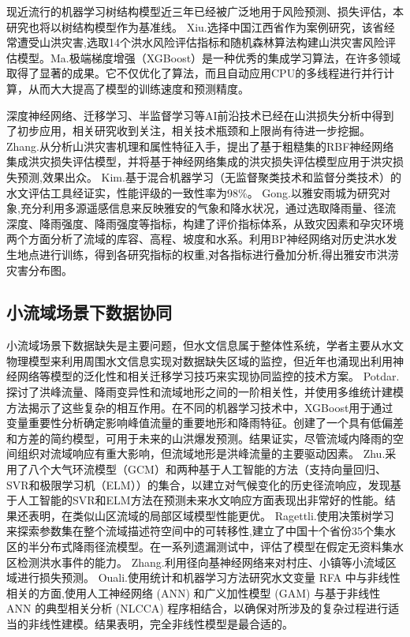 \documentclass{ctexart}
\begin{document}
现近流行的机器学习树结构模型近三年已经被广泛地用于风险预测、损失评估，本研究也将以树结构模型作为基准线。
Xiu.\cite{xiuqin2019risk}选择中国江西省作为案例研究，该省经常遭受山洪灾害,选取14个洪水风险评估指标和随机森林算法构建山洪灾害风险评估模型。Ma.\cite{ma2021xgboost}极端梯度增强（XGBoost）是一种优秀的集成学习算法，在许多领域取得了显著的成果。它不仅优化了算法，而且自动应用CPU的多线程进行并行计算，从而大大提高了模型的训练速度和预测精度。

深度神经网络、迁移学习、半监督学习等AI前沿技术已经在山洪损失分析中得到了初步应用，相关研究收到关注，相关技术瓶颈和上限尚有待进一步挖掘。
Zhang.\cite{zhang2021loss}从分析山洪灾害机理和属性特征入手，提出了基于粗糙集的RBF神经网络集成洪灾损失评估模型，并将基于神经网络集成的洪灾损失评估模型应用于洪灾损失预测,效果出众。
Kim.\cite{kim2019hybrid}基于混合机器学习（无监督聚类技术和监督分类技术）的水文评估工具经证实，性能评级的一致性率为98\%。
Gong.\cite{gong2020hazard}以雅安雨城为研究对象,充分利用多源遥感信息来反映雅安的气象和降水状况，通过选取降雨量、径流深度、降雨强度、降雨强度等指标，构建了评价指标体系，从致灾因素和孕灾环境两个方面分析了流域的库容、高程、坡度和水系。利用BP神经网络对历史洪水发生地点进行训练，得到各研究指标的权重,对各指标进行叠加分析,得出雅安市洪涝灾害分布图。




\subsection{小流域场景下数据协同}


小流域场景下数据缺失是主要问题，但水文信息属于整体性系统，学者主要从水文物理模型来利用周围水文信息实现对数据缺失区域的监控，但近年也涌现出利用神经网络等模型的泛化性和相关迁移学习技巧来实现协同监控的技术方案。
Potdar.\cite{potdar2021toward}探讨了洪峰流量、降雨变异性和流域地形之间的一阶相关性，并使用多维统计建模方法揭示了这些复杂的相互作用。在不同的机器学习技术中，XGBoost用于通过变量重要性分析确定影响峰值流量的重要地形和降雨特征。创建了一个具有低偏差和方差的简约模型，可用于未来的山洪爆发预测。结果证实，尽管流域内降雨的空间组织对流域响应有重大影响，但流域地形是洪峰流量的主要驱动因素。
Zhu.\cite{zhu2019hydrological}采用了八个大气环流模型（GCM）和两种基于人工智能的方法（支持向量回归、SVR和极限学习机（ELM））的集合，以建立对气候变化的历史径流响应，发现基于人工智能的SVR和ELM方法在预测未来水文响应方面表现出非常好的性能。结果还表明，在类似山区流域的局部区域模型性能更优。
Ragettli.\cite{ragettli2017modeling}使用决策树学习来探索参数集在整个流域描述符空间中的可转移性,建立了中国十个省份35个集水区的半分布式降雨径流模型。在一系列遗漏测试中，评估了模型在假定无资料集水区检测洪水事件的能力。
Zhang.\cite{zhang2021loss}利用径向基神经网络来对村庄、小镇等小流域区域进行损失预测。
Ouali.\cite{ouali2017fully}使用统计和机器学习方法研究水文变量 RFA 中与非线性相关的方面,使用人工神经网络 (ANN) 和广义加性模型 (GAM) 与基于非线性 ANN 的典型相关分析 (NLCCA) 程序相结合，以确保对所涉及的复杂过程进行适当的非线性建模。结果表明，完全非线性模型是最合适的。
\end{document}
